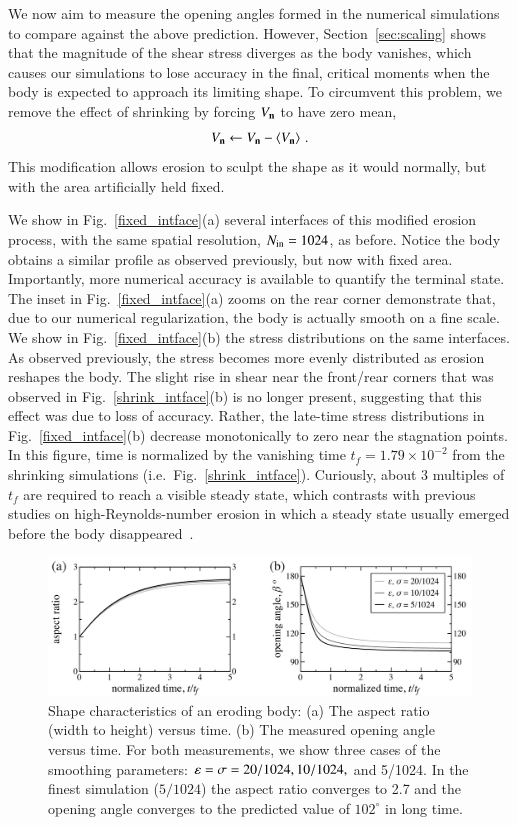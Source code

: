 \documentclass[preprint, 10pt]{elsarticle}
\begin{document}
We now aim to measure the opening angles formed in the numerical simulations to compare against the above prediction. However, Section~\ref{sec:scaling} shows that the magnitude of the shear stress diverges as the body vanishes, which causes our simulations to lose accuracy in the final, critical moments when the body is expected to approach its limiting shape. To circumvent this problem, we remove the effect of shrinking by forcing $V_{\mathbf{n}}$ to have zero mean,
\begin{align}
V_{\mathbf{n}} \leftarrow V_{\mathbf{n}} - \left< V_{\mathbf{n}} \right> \, .
\end{align}
This modification allows erosion to sculpt the shape as it would normally, but with the area artificially held fixed.

We show in Fig.~\ref{fixed_intface}(a) several interfaces of this modified erosion process, with the same spatial resolution, $N_{\mathrm{in}} = 1024$, as before. Notice the body obtains a similar profile as observed previously, but now with fixed area. Importantly, more numerical accuracy is available to quantify the terminal state. The inset in Fig.~\ref{fixed_intface}(a) zooms on the rear corner demonstrate that, due to our numerical regularization, the body is actually smooth on a fine scale. We show in Fig.~\ref{fixed_intface}(b) the stress distributions on the same interfaces. As observed previously, the stress becomes more evenly distributed as erosion reshapes the body. The slight rise in shear near the front/rear corners that was observed in Fig.~\ref{shrink_intface}(b) is no longer present, suggesting that this effect was due to loss of accuracy. Rather, the late-time stress distributions in Fig.~\ref{fixed_intface}(b) decrease monotonically to zero near the stagnation points. In this figure, time is normalized by the vanishing time $t_f = 1.79 \times 10^{-2}$ from the shrinking simulations (i.e.~Fig.~\ref{shrink_intface}). Curiously, about 3 multiples of $t_f$ are required to reach a visible steady state, which contrasts with previous studies on high-Reynolds-number erosion in which a steady state usually emerged before the body disappeared~\cite{moo-ris-chi-zha-she2013}.  
\begin{figure}%
\begin{center}
\includegraphics[width = 0.85 \textwidth]{./figs/arangle.pdf}
\caption{Shape characteristics of an eroding body: (a) The aspect ratio (width to height) versus time. (b) The measured opening angle versus time. For both measurements, we show three cases of the smoothing parameters: $\varepsilon = \sigma = 20/1024, 10/1024,$ and 5/1024. In the finest simulation ($5/1024$) the aspect ratio converges to 2.7 and the opening angle converges to the predicted value of $102^{\circ}$ in long time.}
\label{fig:arangle}
\end{center}
\end{figure}
\end{document}
